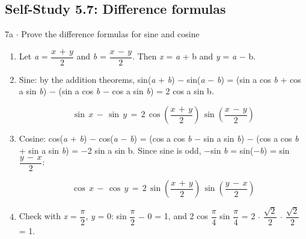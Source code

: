 \documentclass[11pt]{article}
\begin{document}
\begin{keepsection}\subsection{Self-Study 5.7: Difference formulas}

\begin{workedbox}{7a \ensuremath{\cdot} Prove the difference formulas for sine and cosine}
\begin{enumerate}
\item Let \textit{a} = {\small\ensuremath{\dfrac{{x}\, +\, {y}}{2}}} and \textit{b} = {\small\ensuremath{\dfrac{{x}\, -\, {y}}{2}}}. Then \textit{x} = \textit{a} + b and \textit{y} = \textit{a} \ensuremath{-} b.
\item {}
Sine: by the addition theorems, sin(\textit{a} + \textit{b}) \ensuremath{-} sin(\textit{a} \ensuremath{-} \textit{b}) = (sin a cos \textit{b} + cos a sin \textit{b}) \ensuremath{-} (sin a cos \textit{b} \ensuremath{-} cos a sin \textit{b}) = 2 cos a sin b.

\begin{equation*}\sin \, {x}\, -\, \sin \, {y}\, =\, 2\, \cos \left(\dfrac{{x}\, +\, {y}}{2}\right)\, \sin \left(\dfrac{{x}\, -\, {y}}{2}\right)\end{equation*}
\item {}
Cosine: cos(\textit{a} + \textit{b}) \ensuremath{-} cos(\textit{a} \ensuremath{-} \textit{b}) = (cos a cos \textit{b} \ensuremath{-} sin a sin \textit{b}) \ensuremath{-} (cos a cos \textit{b} + sin a sin \textit{b}) = \ensuremath{-}2 sin a sin b. Since sine is odd, \ensuremath{-}sin \textit{b} = sin(\ensuremath{-}\textit{b}) = sin {\small\ensuremath{\dfrac{{y}\, -\, {x}}{2}}}:

\begin{equation*}\cos \, {x}\, -\, \cos \, {y}\, =\, 2\, \sin \left(\dfrac{{x}\, +\, {y}}{2}\right)\, \sin \left(\dfrac{{y}\, -\, {x}}{2}\right)\end{equation*}
\item Check with \textit{x} = {\small\ensuremath{\dfrac{π}{2}}}, \textit{y} = 0: sin {\small\ensuremath{\dfrac{π}{2}}} \ensuremath{-} 0 = 1, and 2 cos {\small\ensuremath{\dfrac{π}{4}}} sin {\small\ensuremath{\dfrac{π}{4}}} = 2 \ensuremath{\cdot} {\small\ensuremath{\dfrac{\sqrt{2}}{2}}} \ensuremath{\cdot} {\small\ensuremath{\dfrac{\sqrt{2}}{2}}} = 1.
\end{enumerate}
\end{workedbox}

\end{keepsection}
\end{document}
